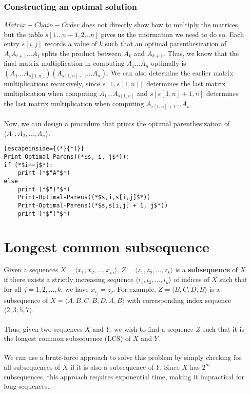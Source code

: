 \documentclass[a4paper]{article}
\begin{document}
\subsubsection{Constructing an optimal solution}
$Matrix-Chain-Order$ does not directly show how to multiply the matrices, but the table $s[1\dots n-1, 2\dots n]$ gives us the information we need to do so. Each entry $s[i,j]$ records a value of $k$ such that an optimal parenthesization of $A_i A_{i+1} \dots A_j$ splits the product between $A_k$ and $A_{k+1}$. Thus, we know that the final matrix multiplication in computing $A_1\dots A_n$ optimally is $(A_1\dots A_{s[1,n]})(A_{s[1,n] + 1}\dots A_n)$. We can also determine the earlier matrix multiplications recursively, since $s[1,s[1,n]]$ determines the last matrix multiplication when computing $A_1\dots A_{s[1,n]}$ and $s[s[1,n] + 1, n]$ determines the last matrix multiplication when computing $A_{s[1,n] + 1}\dots A_n$.\\ \\
Now, we can design a procedure that prints the optimal parenthesization of $\langle A_1, A_2, \dots, A_n\rangle$.
\begin{lstlisting}[escapeinside={(*}{*)}]
Print-Optimal-Parens((*$s, i, j$*)):
if (*$i==j$*):
	print (*$"A"$*)
else 
	print (*$"("$*)
	Print-Optimal-Parens((*$s,i,s[i,j]$*))
	Print-Optimal-Parens((*$s,s[i,j] + 1, j$*))
	print (*$")"$*)
\end{lstlisting}

\section{Longest common subsequence}
Given a sequences $X = \langle x_1, x_2, \dots, x_m\rangle$, $Z = \langle z_1, z_2, \dots, z_k\rangle$ is a \textbf{subsequence} of $X$ if there exists a strictly increasing sequence $\langle i_1, i_2, \dots, i_k\rangle$ of indices of $X$ such that for all $j=1,2,\dots,k$, we have $x_{i_j} = z_j$. For example, $Z = \langle B, C, D, B\rangle$ is a subsequence of $X = \langle A, B, C, B, D, A, B\rangle$ with corresponding index sequence $\langle 2, 3, 5, 7\rangle$.\\ \\
Thus, given two sequences $X$ and $Y$, we wish to find a sequence $Z$ such that it is the longest common subsequence (LCS) of $X$ and $Y$.\\ \\
We can use a brute-force approach to solve this problem by simply checking for all subsequences of $X$ if it is also a subsequence of $Y$. Since $X$ has $2^m$ subsequences, this approach requires exponential time, making it impractical for long sequences.
\end{document}

